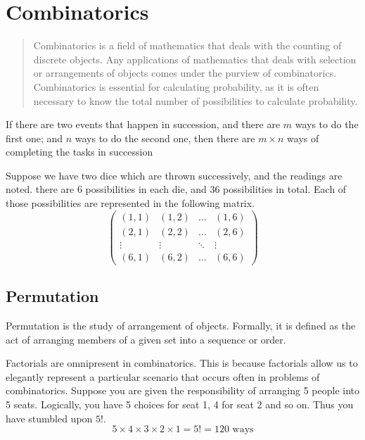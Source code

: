 \chapter{Combinatorics}

\begin{abstract}
    Combinatorics is a field of mathematics that deals with the counting of discrete objects. Any applications of mathematics that deals with selection or arrangements of objects comes under the purview of combinatorics. Combinatorics is essential for calculating probability, as it is often necessary to know the total number of possibilities to calculate probability.
\end{abstract}

\begin{theorem}
    If there are two events that happen  in succession, and there are \mbox{$m$} ways to do the first one; and \mbox{$n$} ways to do the second one, then there are \mbox{$m\times n$} ways of completing the tasks in succession
\end{theorem}

\begin{example}
    Suppose we have two dice which are thrown successively, and the readings are noted. there are 6 possibilities in each die, and 36 possibilities in total. Each of those possibilities are represented in the following matrix.
    \begin{equation*}
        \begin{pmatrix}
            (1,1)  & (1,2)  & \dots  & (1,6)  \\
            (2,1)  & (2,2)  & \dots  & (2,6)  \\
            \vdots & \vdots & \ddots & \vdots \\
            (6,1)  & (6,2)  & \dots  & (6,6)
        \end{pmatrix}
    \end{equation*}
\end{example}

\section{Permutation}
Permutation is the study of arrangement of objects. Formally, it is defined as the act of arranging members of a given set into a sequence or order.

\begin{intuition}
Factorials are omnipresent in combinatorics. This is because factorials allow us to elegantly represent a particular scenario that occurs often in problems of combinatorics. Suppose you are given the responsibility of arranging 5 people into 5 seats. Logically, you have 5 choices for seat 1, 4 for seat 2 and so on. Thus you have stumbled upon \mbox{$5!$}.
\begin{equation*}
    \boxed{5} \times \boxed{4} \times \boxed{3} \times \boxed{2} \times \boxed{1}  = 5! = 120 \text{ ways}
\end{equation*} 
\end{intuition}